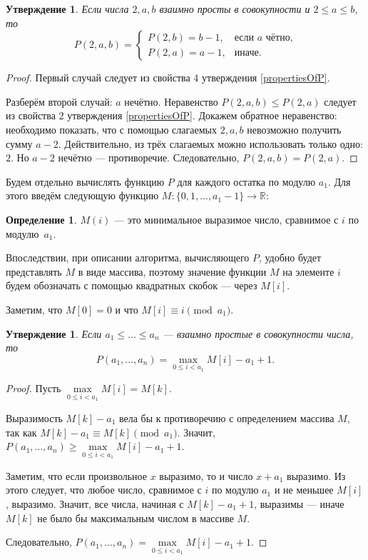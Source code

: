 \documentclass[12pt]{article}
\newtheorem{proposition}[theorem]{Утверждение}
\theoremstyle{definition}
\newtheorem{definition}[theorem]{Определение}
\begin{document}
\begin{proposition}
Если числа $2, a, b$ взаимно просты в совокупности и $2 \le a \le b$, то \begin{equation*}
P(2, a, b) = \begin{cases}
P(2, b) = b - 1, &\text{если $a$ чётно,} \\
P(2, a) = a - 1,&\text{иначе.}
\end{cases}
\end{equation*}

\end{proposition}
\begin{proof}
Первый случай следует из свойства 4 утверждения \ref{propertiesOfP}.

Разберём второй случай: $a$ нечётно. Неравенство $P(2, a, b) \le P(2, a)$ следует из свойства $2$ утверждения \ref{propertiesOfP}. Докажем обратное неравенство: необходимо показать, что с помощью слагаемых $2, a, b$ невозможно получить сумму $a - 2$. Действительно, из трёх слагаемых можно использовать только одно: $2$. Но $a - 2$ нечётно --- противоречие. Следовательно, $P(2, a, b) = P(2, a)$.
\end{proof}

Будем отдельно вычислять функцию $P$ для каждого остатка по модулю $a_1$. Для этого введём следующую функцию $M : \{ 0, 1, \dots, a_1 - 1\} \rightarrow \mathbb{R}$:

\begin{definition}
$M(i)$ --- это минимальное выразимое число, сравнимое с $i$ по модулю~$a_1$.
\end{definition}

Впоследствии, при описании алгоритма, вычисляющего $P$, удобно будет представлять $M$ в виде массива, поэтому значение функции $M$ на элементе $i$ будем обозначать с помощью квадратных скобок --- через $M[i]$.

Заметим, что $M[0] = 0$ и что $M[i] \equiv i \pmod {a_1}$.

\begin{proposition}
\label{algorithm:lemma1}
Если $a_1 \le \dots \le a_n$ --- взаимно простые в совокупности числа, то \begin{equation*}
P(a_1, \dots, a_n) = \max\limits_{0 \le i < a_1} M[i] - a_1 + 1.
\end{equation*}
\end{proposition}
\begin{proof}
Пусть $\max\limits_{0 \le i < a_1} M[i] = M[k]$.

Выразимость $M[k] - a_1$ вела бы к противоречию с определением массива $M$, так как $M[k] - a_1 \equiv M[k] \pmod {a_1}$. Значит, $P(a_1, \dots, a_n) \ge \max\limits_{0 \le i < a_1} M[i] - a_1 + 1$.

Заметим, что если произвольное $x$ выразимо, то и число $x + a_1$ выразимо. Из этого следует, что любое число, сравнимое с $i$ по модулю $a_1$ и не меньшее $M[i]$, выразимо. Значит, все числа, начиная с $M[k] - a_1 + 1$, выразимы --- иначе $M[k]$ не было бы максимальным числом в массиве $M$.

Следовательно, $P(a_1, \dots, a_n) = \max\limits_{0 \le i < a_1} M[i] - a_1 + 1$.
\end{proof}
\end{document}
